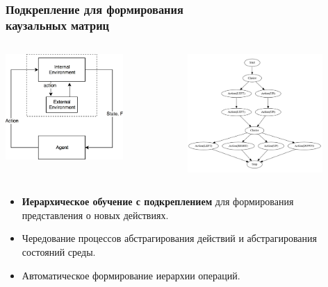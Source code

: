 	\begin{frame}
		\frametitle{Подкрепление для формирования\\каузальных матриц}
		\footnotesize
		
		\begin{columns}
			\begin{column}{0.5\textwidth}
				\centering
				\includegraphics[width=0.7\textwidth]{schema.png}
			\end{column}
			\begin{column}{0.5\textwidth}
				\includegraphics[width=0.8\textwidth]{autoham.png}
			\end{column}
		\end{columns}
		
		
		\begin{itemize}
			\item \textbf{Иерархическое обучение с подкреплением} для формирования представления о новых действиях.
			\item Чередование процессов абстрагирования действий и абстрагирования состояний среды.
			\item Автоматическое формирование иерархии операций.
		\end{itemize}
	
	\end{frame}	
